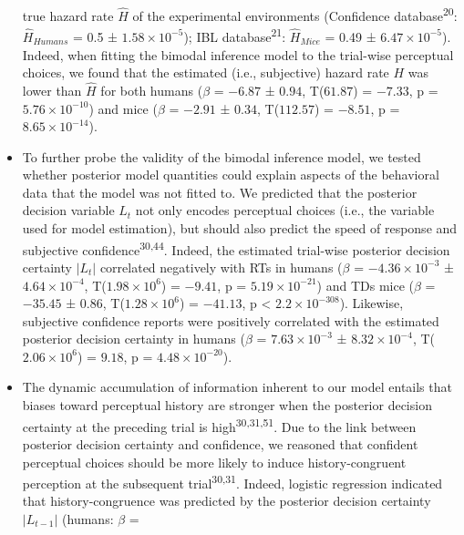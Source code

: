 \documentclass[
]{article}
\begin{document}
\begin{itemize}
  true hazard rate \(\hat{H}\) of the experimental environments
  (Confidence database\textsuperscript{20}: \(\hat{H}_{Humans}\) = 0.5 ±
  \ensuremath{1.58\times 10^{-5}}); IBL database\textsuperscript{21}:
  \(\hat{H}_{Mice}\) = 0.49 ± \ensuremath{6.47\times 10^{-5}}). Indeed,
  when fitting the bimodal inference model to the trial-wise perceptual
  choices, we found that the estimated (i.e., subjective) hazard rate
  \(H\) was lower than \(\hat{H}\) for both humans (\(\beta\) =
  \(-6.87\) ± \(0.94\), T(\(61.87\)) = \(-7.33\), p =
  \(\ensuremath{5.76\times 10^{-10}}\)) and mice (\(\beta\) = \(-2.91\)
  ± \(0.34\), T(\(112.57\)) = \(-8.51\), p =
  \(\ensuremath{8.65\times 10^{-14}}\)).
\item
  To further probe the validity of the bimodal inference model, we
  tested whether posterior model quantities could explain aspects of the
  behavioral data that the model was not fitted to. We predicted that
  the posterior decision variable \(L_t\) not only encodes perceptual
  choices (i.e., the variable used for model estimation), but should
  also predict the speed of response and subjective
  confidence\textsuperscript{30,44}. Indeed, the estimated trial-wise
  posterior decision certainty \(|L_t|\) correlated negatively with RTs
  in humans (\(\beta\) = \(\ensuremath{-4.36\times 10^{-3}}\) ±
  \(\ensuremath{4.64\times 10^{-4}}\),
  T(\(\ensuremath{1.98\times 10^{6}}\)) = \(-9.41\), p =
  \(\ensuremath{5.19\times 10^{-21}}\)) and TDs mice (\(\beta\) =
  \(-35.45\) ± \(0.86\), T(\(\ensuremath{1.28\times 10^{6}}\)) =
  \(-41.13\), p < \(\ensuremath{2.2\times 10^{-308}}\)). Likewise, subjective confidence reports were
  positively correlated with the estimated posterior decision certainty
  in humans (\(\beta\) = \(\ensuremath{7.63\times 10^{-3}}\) ±
  \(\ensuremath{8.32\times 10^{-4}}\),
  T(\(\ensuremath{2.06\times 10^{6}}\)) = \(9.18\), p =
  \(\ensuremath{4.48\times 10^{-20}}\)).
\item
  The dynamic accumulation of information inherent to our model entails
  that biases toward perceptual history are stronger when the posterior
  decision certainty at the preceding trial is
  high\textsuperscript{30,31,51}. Due to the link between posterior
  decision certainty and confidence, we reasoned that confident
  perceptual choices should be more likely to induce history-congruent
  perception at the subsequent trial\textsuperscript{30,31}. Indeed,
  logistic regression indicated that history-congruence was predicted by
  the posterior decision certainty \(|L_{t-1}|\) (humans: \(\beta\) =

\end{itemize}
\end{document}
